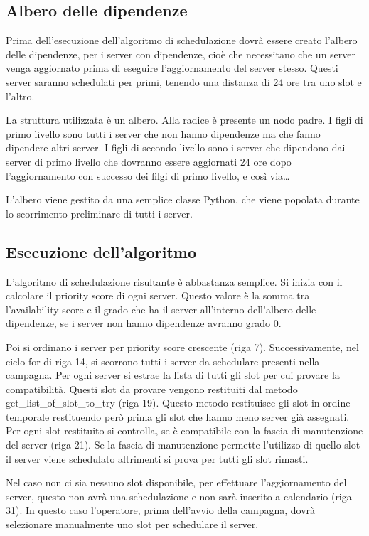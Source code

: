 \subsection{Albero delle dipendenze}
Prima dell’esecuzione dell’algoritmo di schedulazione dovrà essere creato 
l’albero delle dipendenze, per i server con dipendenze, cioè che necessitano 
che un server venga aggiornato prima di eseguire l’aggiornamento del server 
stesso. Questi server saranno schedulati per primi, tenendo una distanza di 24 
ore tra uno slot e l’altro.

La struttura utilizzata è un albero. Alla radice è presente un nodo padre. 
I figli di primo livello sono tutti i server che non hanno dipendenze ma che 
fanno dipendere altri server.
I figli di secondo livello sono i server che dipendono dai server di primo livello
che dovranno essere aggiornati 24 ore dopo l'aggiornamento con successo dei filgi 
di primo livello, e così via\dots

L’albero viene gestito da una semplice classe Python, che viene popolata durante 
lo scorrimento preliminare di tutti i server.


\subsection{Esecuzione dell’algoritmo}
L’algoritmo di schedulazione risultante è abbastanza semplice. 
Si inizia con il calcolare il priority score di ogni server.
Questo valore è la somma tra l’availability score e il grado che 
ha il server all'interno dell’albero delle dipendenze, se i server non 
hanno dipendenze avranno grado 0.

Poi si ordinano i server per priority score crescente (riga 7).
Successivamente, nel ciclo for di riga 14, si scorrono tutti i server 
da schedulare presenti nella campagna.
Per ogni server si estrae la lista di tutti gli slot per cui provare 
la compatibilità. Questi slot da provare vengono restituiti dal metodo 
get\_list\_of\_slot\_to\_try (riga 19). Questo metodo restituisce gli slot 
in ordine temporale restituendo però prima gli slot che hanno meno server 
già assegnati.
Per ogni slot restituito si controlla, se è compatibile con la fascia di 
manutenzione del server (riga 21). Se la fascia di manutenzione permette 
l’utilizzo di quello slot il server viene schedulato altrimenti si prova 
per tutti gli slot rimasti.

Nel caso non ci sia nessuno slot disponibile, per effettuare 
l’aggiornamento del server, questo non avrà una schedulazione e non sarà 
inserito a calendario (riga 31). In questo caso l’operatore, prima 
dell’avvio della campagna, dovrà selezionare manualmente uno slot per 
schedulare il server.\\

